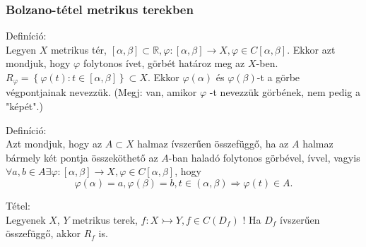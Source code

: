 \documentclass[12pt,a4paper]{scrartcl}
\newenvironment{definicio}{}{}
\newenvironment{tetel}{}{}
\begin{document}
\hypertarget{bolzano-tetel-metrikus-terekben}{%
\subsubsection{Bolzano-tétel metrikus
terekben}\label{bolzano-tetel-metrikus-terekben}}

\begin{definicio}

Definíció:\\
Legyen \(X\) metrikus tér,
\(\left. \left\lbrack {\alpha,\beta} \right\rbrack \subset {\mathbb{R}},\varphi:\left\lbrack {\alpha,\beta} \right\rbrack\rightarrow X,\varphi \in C\left\lbrack {\alpha,\beta} \right\rbrack \right.\).
Ekkor azt mondjuk, hogy \(\varphi\) folytonos ívet, görbét határoz meg
az \(X\)-ben.
\(R_{\varphi} = \left\{ {\varphi\left( t \right):t \in \left\lbrack {\alpha,\beta} \right\rbrack} \right\} \subset X\).
Ekkor \(\varphi\left( \alpha \right)\) és
\(\varphi\left( \beta \right)\)-t a görbe végpontjainak nevezzük. (Megj:
van, amikor \(\varphi\) -t nevezzük görbének, nem pedig a "képét".)

\end{definicio}

\begin{definicio}

Definíció:\\
Azt mondjuk, hogy az \(A \subset X\) halmaz ívszerűen összefüggő, ha az
\(A\) halmaz bármely két pontja összeköthető az \(A\)-ban haladó
folytonos görbével, ívvel, vagyis
\(\left. \forall a,b \in A\exists\varphi:\left\lbrack {\alpha,\beta} \right\rbrack\rightarrow X,\varphi \in C\left\lbrack {\alpha,\beta} \right\rbrack \right.\),
hogy
\[\left. \varphi\left( \alpha \right) = a,\varphi\left( \beta \right) = b,t \in \left( {\alpha,\beta} \right)\Rightarrow\varphi\left( t \right) \in A \right..\]

\end{definicio}

\begin{tetel}

Tétel:\\
Legyenek \(X\), \(Y\) metrikus terek,
\(\left. f:X\rightarrowtail Y,f \in C\left( D_{f} \right) \right.\) ! Ha
\(D_{f}\) ívszerűen összefüggő, akkor \(R_{f}\) is.

\end{tetel}
\end{document}
